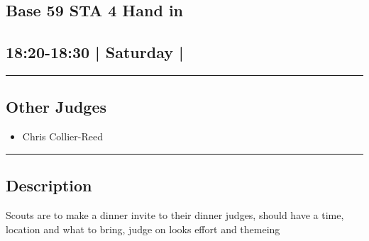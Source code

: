 \documentclass[10pt, A5]{article}
\begin{document}
	

		\begin{framed}
			\begin{minipage}{\textwidth}

			\setcounter{section}{68}
							\section{\faStar \: Base 59 \faStar \: STA 4 Hand in}
						
			\subsection*{18:20-18:30 | Saturday | }

			\vspace{0.25cm}
			\hrule
			\vspace{0.25cm}


			\subsection*{Other Judges}
							

				\begin{multicols}{2}

			\begin{itemize}
											\item Chris Collier-Reed
								\end{itemize}

			\vfill\null
			\columnbreak

			\begin{itemize}
								\end{itemize}

			\vfill\null

			\end{multicols}

			\vspace{0.25cm}
			\hrule
			\vspace{0.25cm}

			\begin{minipage}{\textwidth}
			\subsection*{\faListAlt \: Description}
			Scouts are to make a dinner invite to their dinner judges, should have a time, location and what to bring, judge on looks effort and themeing
			\end{minipage}


	\end{minipage}
	\end{framed}
\end{document}
